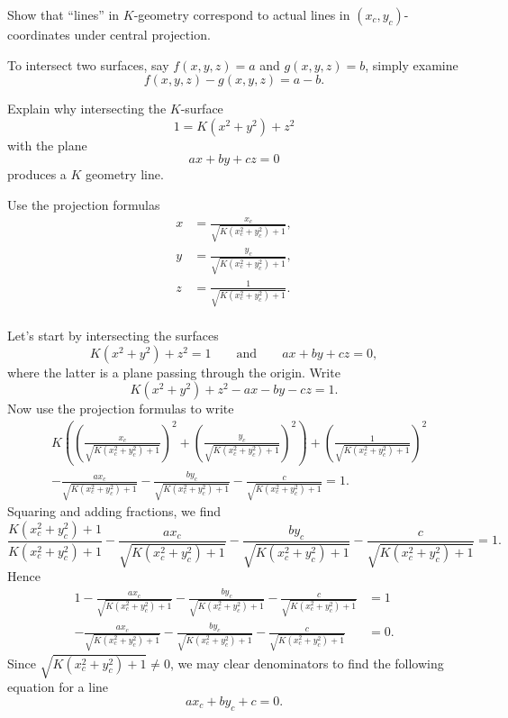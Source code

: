 \documentclass{ximera}
\begin{document}
\begin{problem}
  Show that ``lines'' in $K$-geometry correspond to actual lines in
  $(x_{c},y_{c})$-coordinates under central projection.

\begin{hint}
  To intersect two surfaces, say $f(x,y,z)=a$ and $g(x,y,z)=b$,
  simply examine
  \[
  f(x,y,z)-g(x,y,z) = a-b.
  \]
\end{hint}

\begin{hint}
  Explain why intersecting the $K$-surface
  \[
  1 = K\left(x^2+y^2\right) + z^2 
  \]
  with the plane
  \[
  ax+by+cz = 0
  \]
  produces a $K$ geometry line.
\end{hint}

\begin{hint}
  Use the projection formulas
  \begin{align*}
      x &= \frac{x_c}{\sqrt{K\left(x_c^2 + y_c^2\right)+1}},\\
      y &= \frac{y_c}{\sqrt{K\left(x_c^2 + y_c^2\right)+1}},\\
      z &= \frac{1}{\sqrt{K\left(x_c^2 + y_c^2\right)+1}}.\\
  \end{align*}
\end{hint}

\begin{freeResponse}
  Let's start by intersecting the surfaces
  \[
  K\left(x^2+y^2\right)+z^2=1\qquad\text{and}\qquad ax+by+cz=0,
  \]
  where the latter is a plane passing through the origin. Write
  \[
  K\left(x^2+y^2\right) + z^2- ax- by-cz=1.
  \]
  Now use the projection formulas to write
  \begin{align*}
    &K\left(\left( \frac{x_c}{\sqrt{K\left(x_c^2 + y_c^2\right)+1}}\right)^2
    +\left(\frac{y_c}{\sqrt{K\left(x_c^2 + y_c^2\right)+1}}\right)^2\right)
    + \left(\frac{1}{\sqrt{K\left(x_c^2 + y_c^2\right)+1}}\right)^2\\
    &-\frac{ax_c}{\sqrt{K\left(x_c^2 + y_c^2\right)+1}}- \frac{by_c}{\sqrt{K\left(x_c^2 + y_c^2\right)+1}}-\frac{c}{\sqrt{K\left(x_c^2 + y_c^2\right)+1}}=1.
  \end{align*}
Squaring and adding fractions, we find
\[
\frac{K\left(x_c^2 + y_c^2\right)+1}{K\left(x_c^2 + y_c^2\right)+1}-\frac{ax_c}{\sqrt{K\left(x_c^2 + y_c^2\right)+1}}- \frac{by_c}{\sqrt{K\left(x_c^2 + y_c^2\right)+1}}-\frac{c}{\sqrt{K\left(x_c^2 + y_c^2\right)+1}}=1.
\]
Hence
\begin{align*}
1-\frac{ax_c}{\sqrt{K\left(x_c^2 + y_c^2\right)+1}}- \frac{by_c}{\sqrt{K\left(x_c^2 + y_c^2\right)+1}}-\frac{c}{\sqrt{K\left(x_c^2 + y_c^2\right)+1}} &=1\\
-\frac{ax_c}{\sqrt{K\left(x_c^2 + y_c^2\right)+1}}- \frac{by_c}{\sqrt{K\left(x_c^2 + y_c^2\right)+1}}-\frac{c}{\sqrt{K\left(x_c^2 + y_c^2\right)+1}} &=0.
\end{align*}
Since $\sqrt{K\left(x_c^2 + y_c^2\right)+1} \ne 0$, we may clear
  denominators to find the following equation for a line
  \[
  ax_c+by_c+c= 0.
  \]
\end{freeResponse}
\end{problem}
\end{document}

